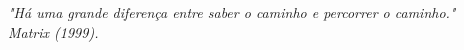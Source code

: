 \begin{epigrafe}
    \vspace*{\fill}
	\begin{flushright}
		\textit{"Há uma grande diferença entre saber o caminho e percorrer o caminho."\\
		        Matrix (1999).}
	\end{flushright}
\end{epigrafe}